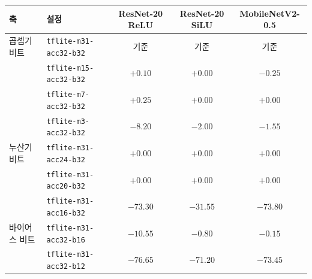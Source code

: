 \setlength{\tabcolsep}{4pt}
\begin{tabular}{llccc}
\toprule
축 & 설정 & ResNet-20 ReLU & ResNet-20 SiLU & MobileNetV2-0.5 \\
\midrule
곱셈기 비트 & \texttt{tflite-m31-acc32-b32} & 기준 & 기준 & 기준 \\
 & \texttt{tflite-m15-acc32-b32} & $+0.10$ & $+0.00$ & $-0.25$ \\
 & \texttt{tflite-m7-acc32-b32} & $+0.25$ & $+0.00$ & $+0.00$ \\
 & \texttt{tflite-m3-acc32-b32} & $-8.20$ & $-2.00$ & $-1.55$ \\
누산기 비트 & \texttt{tflite-m31-acc24-b32} & $+0.00$ & $+0.00$ & $+0.00$ \\
 & \texttt{tflite-m31-acc20-b32} & $+0.00$ & $+0.00$ & $+0.00$ \\
 & \texttt{tflite-m31-acc16-b32} & $-73.30$ & $-31.55$ & $-73.80$ \\
바이어스 비트 & \texttt{tflite-m31-acc32-b16} & $-10.55$ & $-0.80$ & $-0.15$ \\
 & \texttt{tflite-m31-acc32-b12} & $-76.65$ & $-71.20$ & $-73.45$ \\
\bottomrule
\end{tabular}
